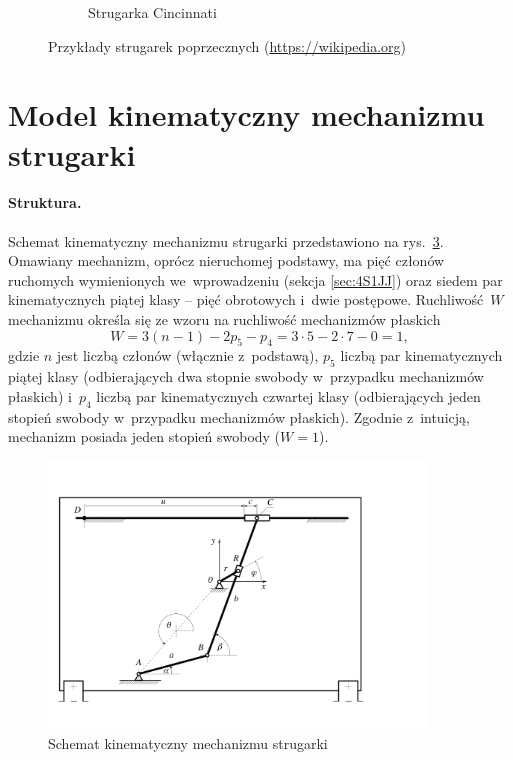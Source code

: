 \documentclass[paper=a4,DIV=12]{tmmlab}
\begin{document}
\begin{figure}[htbp]
\begin{subfigure}[b]{0.5\textwidth}
    \caption{Strugarka Cincinnati}
    \label{fig:0W8XC}
  \end{subfigure}
  \caption{Przykłady strugarek poprzecznych (\url{https://wikipedia.org})}
  \label{fig:27G0D}
\end{figure}

\section{Model kinematyczny mechanizmu strugarki}
\label{sec:V9TW6}

\paragraph{Struktura.} Schemat kinematyczny mechanizmu strugarki przedstawiono
na rys.~\ref{fig:4P8Y9}. Omawiany mechanizm, oprócz nieruchomej podstawy, ma
pięć członów ruchomych wymienionych we~wprowadzeniu (sekcja \ref{sec:4S1JJ})
oraz siedem par kinematycznych piątej klasy -- pięć obrotowych i~dwie
postępowe. Ruchliwość~$W$ mechanizmu określa się ze wzoru na ruchliwość
mechanizmów płaskich~\cite{oledzki:1987:podstawy}
\begin{equation}
  W = 3 (n-1) - 2 p_5 - p_4 = 3 \cdot 5 - 2 \cdot 7 - 0 = 1,
  \label{eq:WGRDI}
\end{equation}
gdzie $n$ jest liczbą członów (włącznie z~podstawą), $p_5$ liczbą par
kinematycznych piątej klasy (od\-bie\-ra\-ją\-cych dwa stopnie swobody
w~przypadku mechanizmów płaskich) i~$p_4$ liczbą par kinematycznych czwartej
klasy (odbierających jeden stopień swobody w~przypadku mechanizmów płaskich).
Zgodnie z~intuicją, mechanizm posiada jeden stopień swobody ($W = 1$).
\begin{figure}
  \centering
  \includegraphics[width=0.9\textwidth]{lab11/strugarka-schemat}
  \caption{Schemat kinematyczny mechanizmu strugarki}
  \label{fig:4P8Y9}
\end{figure}
\end{document}
